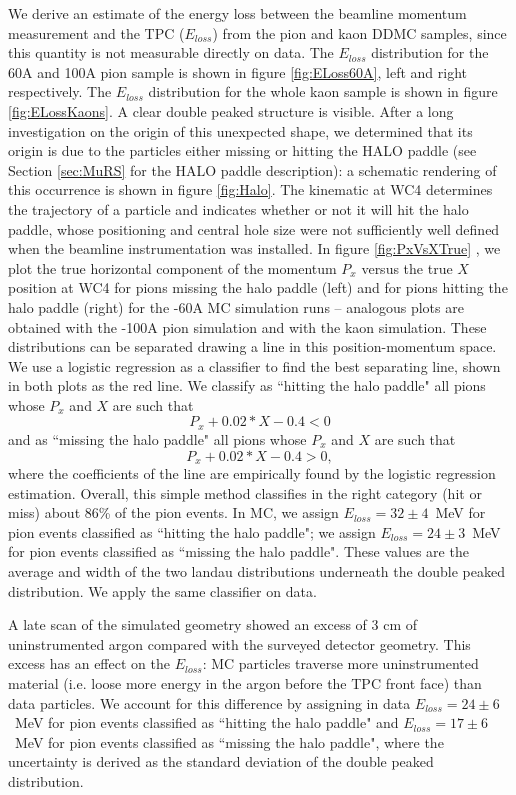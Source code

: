 We derive an estimate of the energy loss between the beamline momentum measurement and the TPC ($E_{loss}$) from the pion and kaon DDMC samples, since this quantity is not  measurable directly on data. 
The $E_{loss}$ distribution for the 60A  and 100A pion sample is shown in figure \ref{fig:ELoss60A}, left and right respectively. The $E_{loss}$ distribution for the  whole kaon sample is shown in figure \ref{fig:ELossKaons}. A clear double peaked structure is visible. After a long investigation on the origin of this unexpected shape, we determined that its origin is due to the particles either missing or hitting the HALO paddle (see Section \ref{sec:MuRS} for the HALO paddle description): a schematic rendering of this occurrence is  shown in figure \ref{fig:Halo}. The kinematic at WC4 determines the trajectory of a particle and indicates whether or not it will hit the halo paddle, whose positioning and central hole size were not sufficiently well defined when the beamline instrumentation was installed. In figure \ref{fig:PxVsXTrue} , we plot the true  horizontal component of the momentum $P_x$ versus the true $X$ position at WC4 for pions missing the halo paddle (left) and for pions hitting the halo paddle (right) for the -60A MC simulation runs -- analogous plots are obtained with the -100A pion simulation and with the kaon simulation. These distributions can be separated drawing a line in this position-momentum space. 
We use a logistic regression  \cite{agresti2013categorical}  as a classifier to find the best separating line, shown in both plots as the red line. We classify as ``hitting the halo paddle" all pions whose $P_x$ and $X$ are such that $$P_x +0.02* X - 0.4 < 0 $$ and as ``missing the halo  paddle" all pions whose $P_x$ and $X$ are such that $$P_x +0.02*X - 0.4 > 0, $$ where the coefficients of the line are empirically found by the logistic regression estimation. Overall, this simple method classifies in the right category (hit or miss) about 86\% of the pion events. In MC, we assign  $E_{loss} = 32 \pm 4 $~MeV for pion events classified as ``hitting the halo paddle"; we assign  $E_{loss} = 24 \pm 3 $~MeV for pion events classified as ``missing the halo paddle". These values are the average and width of the two landau distributions underneath the double peaked distribution. We apply the same classifier on data. 

A late scan of the simulated geometry showed an excess of 3 cm of uninstrumented argon compared with the surveyed detector geometry. This excess has an effect on the $E_{loss}$: MC particles traverse more uninstrumented material  (i.e. loose more energy in the argon before the TPC front face) than data particles.
We account for this difference by assigning in data $E_{loss} = 24 \pm 6 $~MeV for pion events classified as ``hitting the halo paddle" and  $E_{loss} = 17 \pm 6 $~MeV for pion events classified as ``missing the halo paddle", where the uncertainty is derived as the standard deviation of the double peaked distribution.

